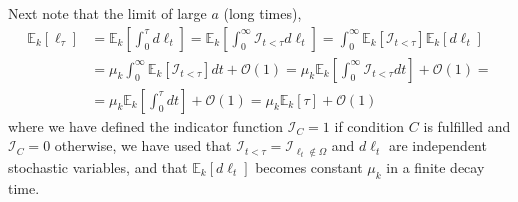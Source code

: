 Next note that the limit of large $a$ (long times),
\begin{align}\label{eq:cmonWlad}
\mathbb{E}_k[\ell_{\tau}] & =\mathbb{E}_k[\int_{0}^{\tau} d\ell_{t}]=
 \mathbb{E}_k[\int_{0}^{\infty} \mathcal{I}_{t<\tau} d\ell_{t}]=\int_{0}^{\infty} \mathbb{E}_k[\mathcal{I}_{t<\tau}]\mathbb{E}_k[d\ell_{t}]\\
 &= \mu_{k}\int_{0}^{\infty} \mathbb{E}_k[\mathcal{I}_{t<\tau}] dt+\mathcal{O}(1)
=\mu_{k} \mathbb{E}_k\left[\int_{0}^{\infty} \mathcal{I}_{t<\tau} dt\right]+\mathcal{O}(1)=\\
 &=\mu_{k} \mathbb{E}_k\left[\int_{0}^{\tau} dt\right]+\mathcal{O}(1)=\mu_{k}\mathbb{E}_k[\tau]+\mathcal{O}(1)
\end{align}
where we have defined the indicator function $\mathcal{I}_{C}=1$ if condition $C$ is fulfilled  and  $\mathcal{I}_{C}=0$ otherwise, we have used that $\mathcal{I}_{t<\tau}=\mathcal{I}_{\ell_{t}\notin \Omega}$ and $d\ell_{t}$ are independent stochastic variables, and  that $\mathbb{E}_k[d\ell_{t}]$ becomes constant $\mu_{k}$ in a finite decay time.

